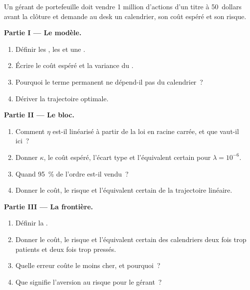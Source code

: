 \begin{problem}\label{pb:mx:the-almgren-chriss-framework:1}
Un gérant de portefeuille doit vendre 1 million d'actions d'un titre à 50~dollars avant la clôture et demande au desk un calendrier, son coût espéré et son risque.

\medskip\noindent\textbf{Partie I --- Le modèle.}
\begin{enumerate}
\item Définir les , les  et une .
\item Écrire le coût espéré et la variance du .
\item Pourquoi le terme permanent ne dépend-il pas du calendrier~?
\item Dériver la trajectoire optimale.
\end{enumerate}

\medskip\noindent\textbf{Partie II --- Le bloc.}
\begin{enumerate}[resume]
\item Comment $\eta$ est-il linéarisé à partir de la loi en racine carrée, et que vaut-il ici~?
\item Donner $\kappa$, le coût espéré, l'écart type et l'équivalent certain pour $\lambda=10^{-6}$.
\item Quand 95~\% de l'ordre est-il vendu~?
\item Donner le coût, le risque et l'équivalent certain de la trajectoire linéaire.
\end{enumerate}

\medskip\noindent\textbf{Partie III --- La frontière.}
\begin{enumerate}[resume]
\item Définir la .
\item Donner le coût, le risque et l'équivalent certain des calendriers deux fois trop patients et deux fois trop pressés.
\item Quelle erreur coûte le moins cher, et pourquoi~?
\item Que signifie l'aversion au risque pour le gérant~?
\end{enumerate}


\end{problem}
